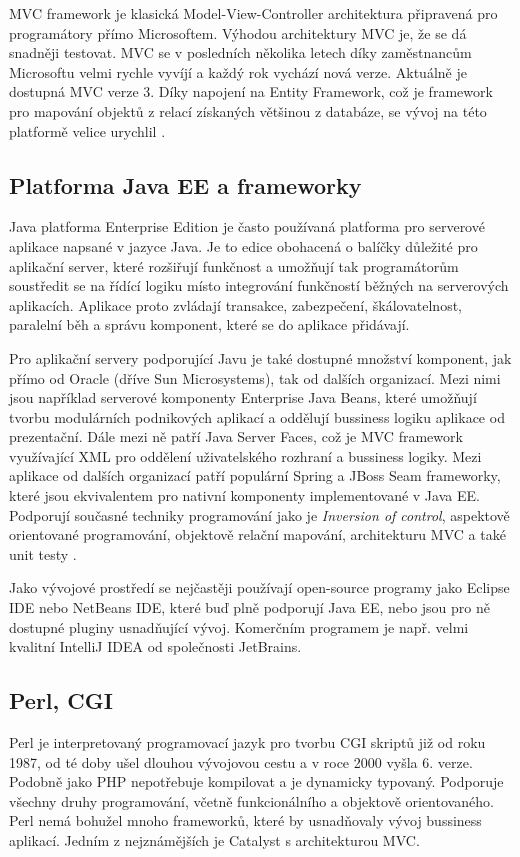 \documentclass[11pt,twoside,a4paper]{book}
\begin{document}
MVC framework je klasická Model-View-Controller architektura připravená pro programátory přímo Microsoftem. Výhodou architektury MVC je, že se dá snadněji testovat. MVC se v posledních několika letech díky zaměstnancům Microsoftu velmi rychle vyvíjí a každý rok vychází nová verze. Aktuálně je dostupná MVC verze 3. Díky napojení na Entity Framework, což je framework pro mapování objektů z relací získaných většinou z databáze, se vývoj na této platformě velice urychlil \cite{asp_net_mvc}.

\subsection{Platforma Java EE a frameworky}
Java platforma Enterprise Edition je často používaná platforma pro serverové aplikace napsané v jazyce Java. Je to edice obohacená o balíčky důležité pro aplikační server, které rozšiřují funkčnost a umožňují tak programátorům soustředit se na řídící logiku místo integrování funkčností běžných na serverových aplikacích. Aplikace proto zvládají transakce, zabezpečení, škálovatelnost, paralelní běh a správu komponent, které se do aplikace přidávají.

Pro aplikační servery podporující Javu je také dostupné množství komponent, jak přímo od Oracle (dříve Sun Microsystems), tak od dalších organizací. Mezi nimi jsou například serverové komponenty Enterprise Java Beans, které umožňují tvorbu modulárních podnikových aplikací a oddělují bussiness logiku aplikace od prezentační. Dále mezi ně patří Java Server Faces, což je MVC framework využívající XML pro oddělení uživatelského rozhraní a bussiness logiky. Mezi aplikace od dalších organizací patří populární Spring a JBoss Seam frameworky, které jsou ekvivalentem pro nativní komponenty implementované v Java EE. Podporují současné techniky programování jako je \textit{Inversion of control}, aspektově orientované programování, objektově relační mapování, architekturu MVC a také unit testy \cite{javaweb}\cite{wiki:frameworks}.

Jako vývojové prostředí se nejčastěji používají open-source programy jako Eclipse IDE nebo NetBeans IDE, které buď plně podporují Java EE, nebo jsou pro ně dostupné pluginy usnadňující vývoj. Komerčním programem je např. velmi kvalitní IntelliJ IDEA od společnosti JetBrains\cite{wiki:ide}.


\subsection{Perl, CGI}
Perl je interpretovaný programovací jazyk pro tvorbu CGI skriptů již od roku 1987, od té doby ušel dlouhou vývojovou cestu a v roce 2000 vyšla 6. verze. Podobně jako PHP nepotřebuje kompilovat a je dynamicky typovaný. Podporuje všechny druhy programování, včetně funkcionálního a objektově orientovaného\cite{wiki:perl}. Perl nemá bohužel mnoho frameworků, které by usnadňovaly vývoj bussiness aplikací. Jedním z nejznámějších je Catalyst s architekturou MVC.
\end{document}
